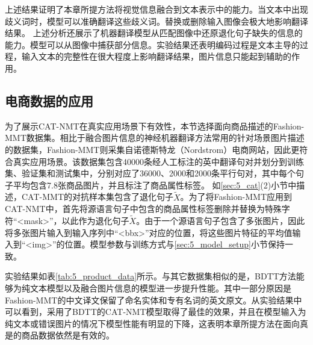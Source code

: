 上述结果证明了本章所提方法将视觉信息融合到文本表示中的能力。当文本中出现歧义词时，模型可以准确翻译这些歧义词。替换或删除输入图像会极大地影响翻译结果。
上述分析还展示了机器翻译模型从匹配图像中还原退化句子缺失的信息的能力。模型可以从图像中捕获部分信息。实验结果还表明编码过程是文本主导的过程，输入文本的完整性在很大程度上影响翻译结果，图片信息只能起到辅助的作用。

\subsection{电商数据的应用}

为了展示CAT-NMT在真实应用场景下有效性，本节选择面向商品描述的Fashion-MMT数据集。相比于融合图片信息的神经机器翻译方法常用的针对场景图片描述的数据集，Fashion-MMT则采集自诺德斯特龙（Nordstrom）电商网站，因此更符合真实应用场景。该数据集包含40000条经人工标注的英中翻译句对并划分到训练集、验证集和测试集中，分别对应了36000、2000和2000条平行句对，其中每个句子平均包含7.8张商品图片，并且标注了商品属性标签。
如\ref{sec:5_cat}(2)小节中描述，CAT-MMT的对抗样本集包含了退化句子$\tilde{X}$。为了将Fashion-MMT应用到CAT-NMT中，首先将源语言句子中包含的商品属性标签删除并替换为特殊字符“<mask>”，以此作为退化句子$\tilde{X}$。由于一个源语言句子包含了多张图片，因此将多张图片输入到输入序列中“<bbx>”对应的位置，将这些图片特征的平均值输入到“<img>”的位置。模型参数与训练方式与\ref{sec:5_model_setup}小节保持一致。


实验结果如表\ref{tab:5_product_data}所示。与其它数据集相似的是，BDTT方法能够为纯文本模型以及融合图片信息的模型进一步提升性能。其中一部分原因是Fashion-MMT的中文译文保留了命名实体和专有名词的英文原文。从实验结果中可以看到，采用了BDTT的CAT-NMT模型取得了最佳的效果，并且在模型输入为纯文本或错误图片的情况下模型性能有明显的下降，这表明本章所提方法在面向真是的商品数据依然是有效的。

